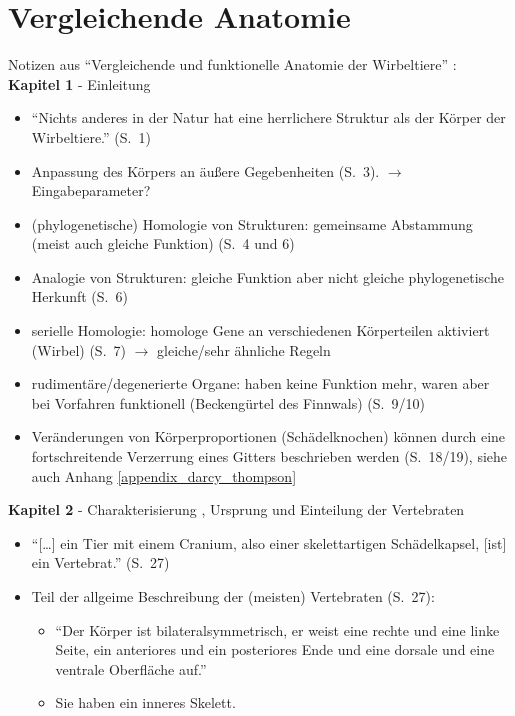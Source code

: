 
\chapter{Vergleichende Anatomie}
\label{appendix_vergleichende_anatomie}

Notizen aus "`Vergleichende und funktionelle Anatomie der Wirbeltiere"' \cite{Vergleichende_Anatomie}:\\

\textbf{Kapitel 1} - Einleitung
\begin{itemize}
 \item "`Nichts anderes in der Natur hat eine herrlichere Struktur als der Körper der Wirbeltiere."' (S.\ 1)
 \item Anpassung des Körpers an äußere Gegebenheiten (S.\ 3). $\rightarrow$ Eingabeparameter?
 \item (phylogenetische) Homologie von Strukturen: gemeinsame Abstammung (meist auch gleiche Funktion) (S.\ 4 und 6)
 \item Analogie von Strukturen: gleiche Funktion aber nicht gleiche phylogenetische Herkunft (S.\ 6)
 \item serielle Homologie: homologe Gene an verschiedenen Körperteilen aktiviert (\zb Wirbel) (S.\ 7) $\rightarrow$ gleiche/sehr ähnliche Regeln
 \item rudimentäre/degenerierte Organe: haben keine Funktion mehr, waren aber bei Vorfahren funktionell (\zb Beckengürtel des Finnwals) (S.\ 9/10)
 \item Veränderungen von Körperproportionen (\zb Schädelknochen) können durch eine fortschreitende Verzerrung eines Gitters beschrieben werden (S.\ 18/19), siehe auch  Anhang \ref{appendix_darcy_thompson}
\end{itemize}

\textbf{Kapitel 2} - Charakterisierung , Ursprung und Einteilung der Vertebraten
\begin{itemize}
 \item "`[\dots] ein Tier mit einem Cranium, also einer skelettartigen Schädelkapsel, [ist] ein Vertebrat."' (S.\ 27)
 \item Teil der allgeime Beschreibung der (meisten) Vertebraten (S.\ 27): 
 \begin{itemize}
  \item "`Der Körper ist bilateralsymmetrisch, \dash er weist eine rechte und eine linke Seite, ein anteriores und ein posteriores Ende und eine dorsale und eine ventrale Oberfläche auf."'
  \item Sie haben ein inneres Skelett.
 \end{itemize}
\end{itemize}

